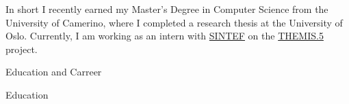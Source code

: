 \documentclass{resume} %
\begin{document}
    
    \begin{rSection}{In short}
        I recently earned my Master’s Degree in Computer Science from the University of Camerino, where I completed a research thesis at the University of Oslo.
        Currently, I am working as an intern with \href{https://www.sintef.no/}{SINTEF} on the \href{https://www.themis-trust.eu/}{THEMIS.5} project.
    \end{rSection}
    
    \begin{rSection}{Education and Carreer}

        
        \begin{rSubsection2}{Education}


\end{rSubsection2}
\end{rSection}
\end{document}
